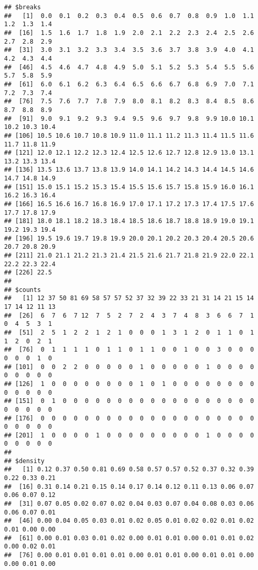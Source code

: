 \documentclass[
]{article}
\begin{document}
\begin{verbatim}
## $breaks
##   [1]  0.0  0.1  0.2  0.3  0.4  0.5  0.6  0.7  0.8  0.9  1.0  1.1  1.2  1.3  1.4
##  [16]  1.5  1.6  1.7  1.8  1.9  2.0  2.1  2.2  2.3  2.4  2.5  2.6  2.7  2.8  2.9
##  [31]  3.0  3.1  3.2  3.3  3.4  3.5  3.6  3.7  3.8  3.9  4.0  4.1  4.2  4.3  4.4
##  [46]  4.5  4.6  4.7  4.8  4.9  5.0  5.1  5.2  5.3  5.4  5.5  5.6  5.7  5.8  5.9
##  [61]  6.0  6.1  6.2  6.3  6.4  6.5  6.6  6.7  6.8  6.9  7.0  7.1  7.2  7.3  7.4
##  [76]  7.5  7.6  7.7  7.8  7.9  8.0  8.1  8.2  8.3  8.4  8.5  8.6  8.7  8.8  8.9
##  [91]  9.0  9.1  9.2  9.3  9.4  9.5  9.6  9.7  9.8  9.9 10.0 10.1 10.2 10.3 10.4
## [106] 10.5 10.6 10.7 10.8 10.9 11.0 11.1 11.2 11.3 11.4 11.5 11.6 11.7 11.8 11.9
## [121] 12.0 12.1 12.2 12.3 12.4 12.5 12.6 12.7 12.8 12.9 13.0 13.1 13.2 13.3 13.4
## [136] 13.5 13.6 13.7 13.8 13.9 14.0 14.1 14.2 14.3 14.4 14.5 14.6 14.7 14.8 14.9
## [151] 15.0 15.1 15.2 15.3 15.4 15.5 15.6 15.7 15.8 15.9 16.0 16.1 16.2 16.3 16.4
## [166] 16.5 16.6 16.7 16.8 16.9 17.0 17.1 17.2 17.3 17.4 17.5 17.6 17.7 17.8 17.9
## [181] 18.0 18.1 18.2 18.3 18.4 18.5 18.6 18.7 18.8 18.9 19.0 19.1 19.2 19.3 19.4
## [196] 19.5 19.6 19.7 19.8 19.9 20.0 20.1 20.2 20.3 20.4 20.5 20.6 20.7 20.8 20.9
## [211] 21.0 21.1 21.2 21.3 21.4 21.5 21.6 21.7 21.8 21.9 22.0 22.1 22.2 22.3 22.4
## [226] 22.5
## 
## $counts
##   [1] 12 37 50 81 69 58 57 57 52 37 32 39 22 33 21 31 14 21 15 14 17 14 12 11 13
##  [26]  6  7  6  7 12  7  5  2  7  2  4  3  7  4  8  3  6  6  7  1  0  4  5  3  1
##  [51]  2  5  1  2  2  1  2  1  0  0  0  1  3  1  2  0  1  1  0  1  1  2  0  2  1
##  [76]  0  1  1  1  1  0  1  1  0  1  1  0  0  1  0  0  3  0  0  0  0  0  0  1  0
## [101]  0  0  2  2  0  0  0  0  0  1  0  0  0  0  0  1  0  0  0  0  0  0  0  0  0
## [126]  1  0  0  0  0  0  0  0  0  1  0  1  0  0  0  0  0  0  0  0  0  0  0  0  0
## [151]  0  1  0  0  0  0  0  0  0  0  0  0  0  0  0  0  0  0  0  0  0  0  0  0  0
## [176]  0  0  0  0  0  0  0  0  0  0  0  0  0  0  0  0  0  0  0  0  0  0  0  0  0
## [201]  1  0  0  0  0  1  0  0  0  0  0  0  0  0  0  1  0  0  0  0  0  0  0  0  0
## 
## $density
##   [1] 0.12 0.37 0.50 0.81 0.69 0.58 0.57 0.57 0.52 0.37 0.32 0.39 0.22 0.33 0.21
##  [16] 0.31 0.14 0.21 0.15 0.14 0.17 0.14 0.12 0.11 0.13 0.06 0.07 0.06 0.07 0.12
##  [31] 0.07 0.05 0.02 0.07 0.02 0.04 0.03 0.07 0.04 0.08 0.03 0.06 0.06 0.07 0.01
##  [46] 0.00 0.04 0.05 0.03 0.01 0.02 0.05 0.01 0.02 0.02 0.01 0.02 0.01 0.00 0.00
##  [61] 0.00 0.01 0.03 0.01 0.02 0.00 0.01 0.01 0.00 0.01 0.01 0.02 0.00 0.02 0.01
##  [76] 0.00 0.01 0.01 0.01 0.01 0.00 0.01 0.01 0.00 0.01 0.01 0.00 0.00 0.01 0.00

\end{verbatim}
\end{document}
